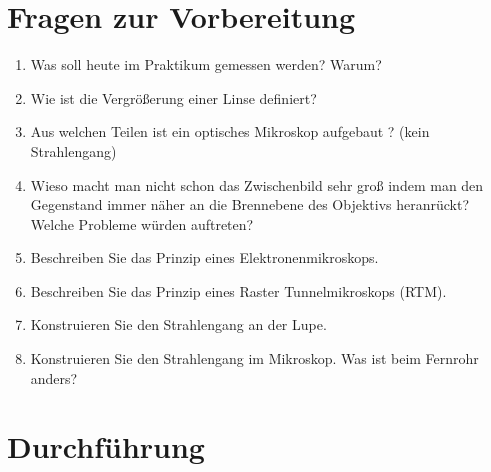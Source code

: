 \section{Fragen zur Vorbereitung}

\begin{enumerate}
 \item Was soll heute im Praktikum gemessen werden? Warum?
 \item Wie ist die Vergrößerung einer Linse definiert?
 \item Aus welchen Teilen ist ein optisches Mikroskop aufgebaut ? (kein Strahlengang)
 \item Wieso macht man nicht schon das Zwischenbild sehr groß indem man den Gegenstand immer näher an die Brennebene des Objektivs heranrückt? Welche Probleme würden auftreten?
 \item Beschreiben Sie das Prinzip eines Elektronenmikroskops.
 \item Beschreiben Sie das Prinzip eines Raster Tunnelmikroskops (RTM).
 \item Konstruieren Sie den Strahlengang an der Lupe.
 \item Konstruieren Sie den Strahlengang im Mikroskop. Was ist beim Fernrohr anders?
%
\end{enumerate}

\section{Durchführung} 

